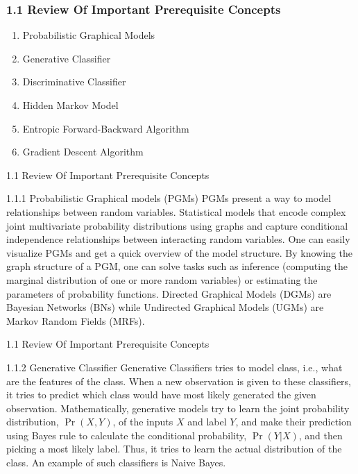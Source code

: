 \documentclass{beamer}
\providecommand{\pr}[1]{\ensuremath{\Pr\left(#1\right)}}
\begin{document}
\begin{frame}
\frametitle{1.1 Review Of Important Prerequisite Concepts}
\begin{enumerate}
    \item Probabilistic Graphical Models
    \item Generative Classifier
    \item Discriminative Classifier
    \item Hidden Markov Model
    \item Entropic Forward-Backward Algorithm
    \item Gradient Descent Algorithm
\end{enumerate}
\end{frame}
\begin{frame}{1.1 Review Of Important Prerequisite Concepts}
\begin{block}{1.1.1 Probabilistic Graphical models (PGMs)}
PGMs present a way to model relationships between random variables. Statistical models that encode complex joint multivariate probability distributions using graphs and capture conditional independence relationships between interacting random variables. One can easily visualize PGMs and get a quick overview of the model structure. By knowing the graph structure of a PGM, one can solve tasks such as inference (computing the marginal distribution of one or more random variables) or estimating the parameters of probability functions. Directed Graphical Models (DGMs) are Bayesian Networks (BNs) while Undirected Graphical Models (UGMs) are Markov Random Fields (MRFs).
\end{block}
\end{frame}
\begin{frame}{1.1 Review Of Important Prerequisite Concepts}
\begin{block}{1.1.2 Generative Classifier}
Generative Classifiers tries to model class, i.e., what are the features of the class. When a new observation is given to these classifiers, it tries to predict which class would have most likely generated the given observation. Mathematically, generative models try to learn the joint probability distribution, $\pr{X, Y}$, of the inputs $X$ and label $Y$, and make their prediction using Bayes rule to calculate the conditional probability, $\pr{Y|X}$, and then picking a most likely label. Thus, it tries to learn the actual distribution of the class. An example of such classifiers is Naive Bayes.
\end{block}
\end{frame}
\end{document}
